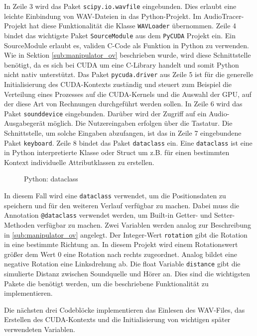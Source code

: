 In Zeile 3 wird das Paket \texttt{scipy.io.wavfile} eingebunden. Dies erlaubt eine leichte Einbindung von WAV-Dateien in das Python-Projekt. Im AudioTracer-Projekt hat diese Funktionalität die Klasse \texttt{WAVLoader} übernommen. Zeile 4 bindet das wichtigste Paket \texttt{SourceModule} aus dem \texttt{PyCUDA} Projekt ein. Ein SourceModule erlaubt es, validen C-Code als Funktion in Python zu verwenden. Wie in Sektion \ref{sub:manipulator_ov} beschrieben wurde, wird diese Schnittstelle benötigt, da es sich bei CUDA um eine C-Library handelt und somit Python nicht nativ unterstützt. Das Paket \texttt{pycuda.driver} aus Zeile 5 ist für die generelle Initialisierung des CUDA-Kontexts zuständig und steuert zum Beispiel die Verteilung eines Prozesses auf die CUDA-Kernels und die Auswahl der GPU, auf der diese Art von Rechnungen durchgeführt werden sollen. In Zeile 6 wird das Paket \texttt{sounddevice} eingebunden. Darüber wird der Zugriff auf ein Audio-Ausgabegerät möglich. Die Nutzereingaben erfolgen über die Tastatur. Die Schnittstelle, um solche Eingaben abzufangen, ist das in Zeile 7 eingebundene Paket \texttt{keyboard}. Zeile 8 bindet das Paket \texttt{dataclass} ein. Eine \texttt{dataclass} ist eine in Python interpretierte Klasse oder Struct um z.B. für einen bestimmten Kontext individuelle Attributklassen zu erstellen. 

\begin{figure}[h!]
	
	\caption{Python: dataclass}
	\label{fig:audioparkour_dataclass}
\end{figure}

In diesem Fall wird eine \texttt{dataclass} verwendet, um die Positionsdaten zu speichern und für den weiteren Verlauf verfügbar zu machen. Dabei muss die Annotation \texttt{@dataclass} verwendet werden, um Built-in Getter- und Setter-Methoden verfügbar zu machen. Zwei Variablen werden analog zur Beschreibung in \ref{sub:manipulator_ov} angelegt. Der Integer-Wert \texttt{rotation} gibt die Rotation in eine bestimmte Richtung an. In diesem Projekt wird einem Rotationswert größer dem Wert 0 eine Rotation nach rechts zugeordnet. Analog bildet eine negative Rotation eine Linksdrehung ab. Die float Variable \texttt{distance} gibt die simulierte Distanz zwischen Soundquelle und Hörer an. 
Dies sind die wichtigsten Pakete die benötigt werden, um die beschriebene Funktionalität zu implementieren.

Die nächsten drei Codeblöcke implementieren das Einlesen des WAV-Files, das Erstellen des CUDA-Kontexts und die Initialisierung von wichtigen später verwendeten Variablen.


